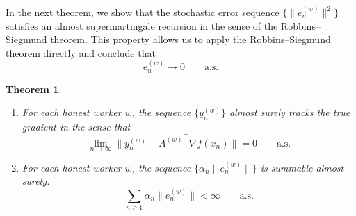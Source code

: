 \documentclass{article}
\newtheorem{theorem}{Theorem}[section]
\begin{document}
In the next theorem, we show that the stochastic error sequence 
$
\{\|e_n^{(w)}\|^2\}
$
satisfies an almost supermartingale recursion in the sense of the Robbins--Siegmund theorem. This property allows us to apply the Robbins--Siegmund theorem directly and conclude that
\[
e_n^{(w)} \to 0
\qquad \text{a.s.}
\]
\begin{theorem}
    \begin{enumerate}
        \item 
For each honest worker $w$, the sequence $\{y_n^{(w)}\}$ almost surely tracks the true gradient in the sense that
\[
    \lim_{n \to \infty} \|y_n^{(w)} - {A^{(w)}}^\top \nabla f(x_n)\| = 0 \qquad \text{a.s.}
\]
\item For each honest worker $w$, the sequence $\{\alpha_n \|e_n^{(w)}\|\}$ is summable almost surely:
\[
    \sum_{n \geq 1} \alpha_n \|e_n^{(w)}\| < \infty \qquad \text{a.s.}
\]
    \end{enumerate}
    \label{Corol:grdioent trachking}
\end{theorem}
\end{document}
